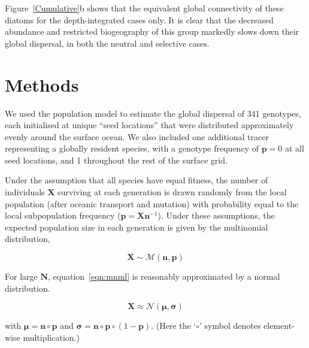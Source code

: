 \documentclass[12pt]{article}
\begin{document}
Figure~\ref{Cumulative}b shows that the equivalent global connectivity of these diatoms for the depth-integrated cases only. It is clear that the decreased abundance and restricted biogeography of this group markedly slows down their global dispersal, in both the neutral and selective cases. 












\section{Methods}


We used the population model to estimate the global dispersal of 341 genotypes, each initialised at unique ``seed locations'' that were distributed approximately evenly around the surface ocean. We also included one additional tracer representing a globally resident species, with a genotype frequency of $\mathbf{p} = 0$ at all seed locations, and 1 throughout the rest of the surface grid.

Under the assumption that all species have equal fitness, the number of individuals $\mathbf{X}$ surviving at each generation is drawn randomly from the local population (after oceanic transport and mutation) with probability equal to the local subpopulation frequency ($\mathbf{p} = \mathbf{X} \mathbf{n}^{-1}$). Under these assumptions, the expected population size in each generation is given by the multinomial distribution, 

\begin{equation}
\label{eqn:mnml}
\mathbf{X}\sim\mathcal{M}(\mathbf{n},\mathbf{p})
\end{equation}

For large $\mathbf{N}$, equation~\ref{eqn:mnml} is reasonably approximated by a normal distribution.

\begin{equation}
\mathbf{X}\approx\mathcal{N}(\boldsymbol{\mu},\boldsymbol{\sigma})
\end{equation}

with $\boldsymbol{\mu}=\mathbf{n}\circ\mathbf{p}$ and $\boldsymbol{\sigma}=\mathbf{n}\circ\mathbf{p}\circ(1-\mathbf{p})$. (Here the `$\circ$' symbol denotes element-wise multiplication.)
\end{document}
